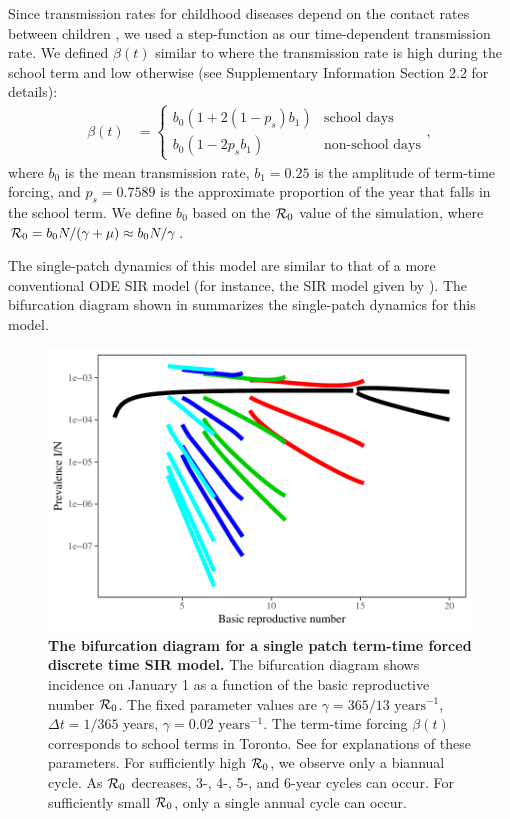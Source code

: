\documentclass[12pt]{article}
\newcommand{\R}{{\cal R}}
\begin{document}
Since transmission rates for childhood diseases depend on the contact rates between children \cite{keeling2002understanding}, we used a step-function as our time-dependent transmission rate. We defined $\beta (t)$ similar to \cite{bauch2003interepidemic} where the transmission rate is high during the school term and low otherwise (see Supplementary Information Section 2.2 for details):
\begin{equation}
\begin{aligned}
\beta (t) &=
\begin{cases} b_0 (1 + 2(1 - p_s) b_1) &\mbox{school days} \\
b_0 (1 - 2 p_s b_1) & \mbox{non-school days}
\end{cases},
\end{aligned}
\end{equation}
where $b_0$ is the mean transmission rate, $b_1 = 0.25$ is the amplitude of term-time forcing, and $p_s = 0.7589$ is the approximate proportion of the year that falls in the school term. We define $b_0$ based on the $\R_0$ value of the simulation, where $\R_0 = b_0 N / (\gamma + \mu) \approx b_0 N / \gamma$.

The single-patch dynamics of this model are similar to that of a more conventional ODE SIR model (for instance, the SIR model given by \cite{earn2000simple}). The bifurcation diagram shown in  summarizes the single-patch dynamics for this model.

\begin{figure}
\centering
\includegraphics[width=\textwidth]{supplementary/bifurcation.pdf}
\caption{\textbf{The bifurcation diagram for a single patch term-time forced discrete time SIR model.}
The bifurcation diagram shows incidence on January 1 as a function of the basic reproductive number $\R_0$. The fixed parameter values are $\gamma = 365/13 \textrm{ years}^{-1}$, $\Delta t = 1/365$ years, $\gamma = 0.02 \textrm{ years}^{-1}$. The term-time forcing $\beta(t)$ corresponds to school terms in Toronto. See  for explanations of these parameters. For sufficiently high $\R_0$, we observe only a biannual cycle. As $\R_0$ decreases, 3-, 4-, 5-, and 6-year cycles can occur. For sufficiently small $\R_0$, only a single annual cycle can occur. }
\label{fig:bifurcation}
\end{figure}
\end{document}
